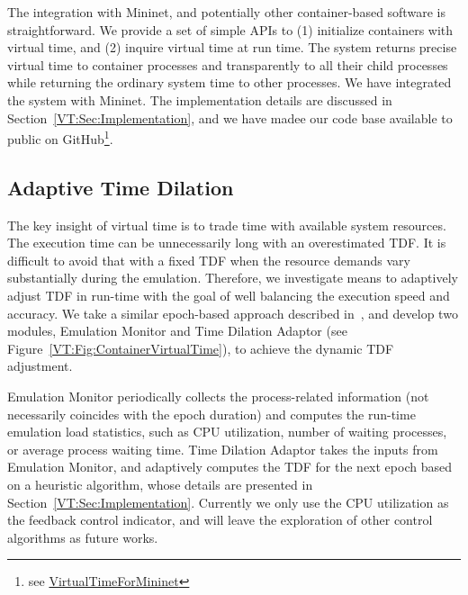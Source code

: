 The integration with Mininet, and potentially other container-based software is straightforward. 
We provide a set of simple APIs to (1) initialize containers with virtual time, and (2) inquire virtual time at run time. 
The system returns precise virtual time to container processes and transparently to all their child processes while returning the ordinary system time to other processes. 
We have integrated the system with Mininet. The implementation details are discussed in Section~\ref{VT:Sec:Implementation}, and we have madee our code base available to public on GitHub\footnote{see \href{https://github.com/littlepretty/VirtualTimeForMininet}{VirtualTimeForMininet}}. 

\subsection{Adaptive Time Dilation}
The key insight of virtual time is to trade time with available system resources.
The execution time can be unnecessarily long with an overestimated TDF. 
It is difficult to avoid that with a fixed TDF when the resource demands vary substantially during the emulation. 
Therefore, we investigate means to adaptively adjust TDF in run-time with the goal of well balancing the execution speed and accuracy. 
We take a similar epoch-based approach described in~\cite{NtwkEmultAdaptVirtTime}, and develop two modules,
Emulation Monitor and Time Dilation Adaptor (see Figure~\ref{VT:Fig:ContainerVirtualTime}), to achieve the dynamic TDF adjustment. 

Emulation Monitor periodically collects the process-related information (not necessarily coincides with the epoch duration)
and computes the run-time emulation load statistics, such as CPU utilization, number of waiting processes, or average process waiting time. 
Time Dilation Adaptor takes the inputs from Emulation Monitor, and adaptively computes the TDF for the next epoch based on a heuristic algorithm,
whose details are presented in Section~\ref{VT:Sec:Implementation}. 
Currently we only use the CPU utilization as the feedback control indicator, and will leave the exploration of other control algorithms as future works. 

